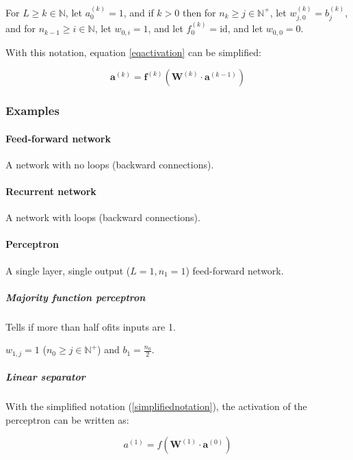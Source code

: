 \documentclass[titlepage]{article}
\begin{document}
        For $L \geq k \in \mathbb{N}$, let $a_0^{(k)} = 1$, and if $k > 0$ then
        for $n_k \geq j \in \mathbb{N}^+$, let $w_{j, 0}^{(k)} = b_{j}^{(k)}$,
        and for $n_{k-1} \geq i \in \mathbb{N}$, let $w_{0,i} = 1$,
        and let $f_0^{(k)} = \text{id}$, and let $w_{0,0}=0$.

        With this notation, equation \ref{eqactivation} can be simplified:

        \begin{equation}\label{eqactivationsimple}
          \mathbf{a}^{(k)} =
            \mathbf{f}^{(k)} \left(
              \mathbf{W}^{(k)} \cdot \mathbf{a}^{(k-1)}
            \right)
        \end{equation}

      \subsubsection{Examples}

        \paragraph{Feed-forward network}

          A network with no loops (backward connections).

        \paragraph{Recurrent network}

          A network with loops (backward connections).

        \paragraph{Perceptron}

          A single layer, single output ($L = 1, n_1 = 1$) feed-forward network.

          \subparagraph{Majority function perceptron}

            Tells if more than half ofits inputs are 1.

            $w_{1,j} = 1$ ($n_0 \geq j \in \mathbb{N}^+$) and
            $b_1 = \frac{n_0}{2}$.

          \subparagraph{Linear separator}
            With the simplified notation (\ref {simplifiednotation}), the
            activation of the perceptron can be written as:

            \begin{equation}
              a^{(1)} = f \left( \mathbf{W}^{(1)} \cdot \mathbf{a}^{(0)} \right)
            \end{equation}
\end{document}
